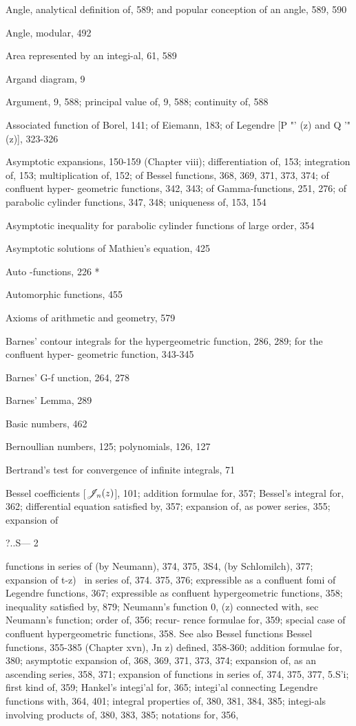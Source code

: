 Angle, analytical definition of, 589; and popular conception of an angle, 589, 590

Angle, modular, 492

Area represented by an integi-al, 61, 589

Argand diagram, 9

Argument, 9, 588; principal value of, 9, 588; continuity of, 588

Associated function of Borel, 141; of Eiemann, 183; of Legendre [P "' (z) and Q '" (z)], 323-326

Asymptotic expansions, 150-159 (Chapter viii); differentiation of, 153; integration of, 153;
multiplication of, 152; of Bessel functions, 368, 369, 371, 373, 374; of confluent hyper-
geometric functions, 342, 343; of Gamma-functions, 251, 276; of parabolic cylinder functions,
347, 348; uniqueness of, 153, 154

Asymptotic inequality for parabolic cylinder functions of large order, 354

Asymptotic solutions of Mathieu's equation, 425

Auto -functions, 226 *

Automorphic functions, 455

Axioms of arithmetic and geometry, 579

Barnes' contour integrals for the hypergeometric function, 286, 289; for the confluent hyper-
geometric function, 343-345

Barnes' G-f unction, 264, 278

Barnes' Lemma, 289

Basic numbers, 462

Bernoullian numbers, 125; polynomials, 126, 127

Bertrand's test for convergence of infinite integrals, 71

Bessel coefficients [$\mathscr{J}_{n}(z)$], 101; addition formulae for, 357; Bessel's integral for, 362;
differential equation satisfied by, 357; expansion of, as power series, 355; expansion of

?..S— 2

%
%
functions in series of (by Neumann), 374, 375, 3S4, (by Schlomilch), 377; expansion of
 t-z)~  in series of, 374. 375, 376; expressible as a confluent fomi of Legendre functions,
367; expressible as confluent hypergeometric functions, 358; inequality satisfied by, 879;
Neumann's function 0, (z) connected with, sec Neumann's function; order of, 356; recur-
rence formulae for, 359; special case of confluent hypergeometric functions, 358. See also
Bessel functions
Bessel functions, 355-385 (Chapter xvn), Jn z) defined, 358-360; addition formulae for, 380;
asymptotic expansion of, 368, 369, 371, 373, 374; expansion of, as an ascending series, 358,
371; expansion of functions in series of, 374, 375, 377, 5.S'i; first kind of, 359; Hankel's
integi'al for, 365; integi'al connecting Legendre functions with, 364, 401; integral properties
of, 380, 381, 384, 385; integi-als involving products of, 380, 383, 385; notations for, 356,

